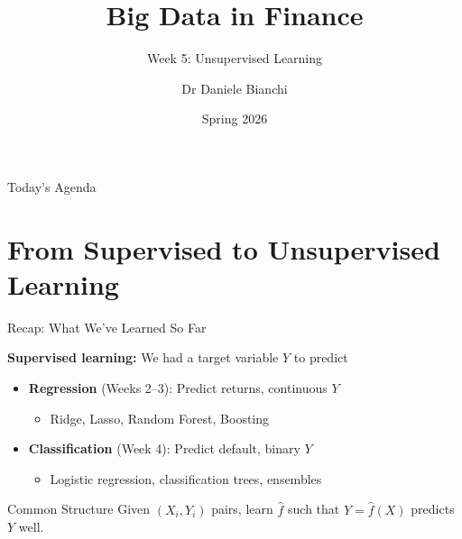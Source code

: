 \documentclass[10pt]{beamer}
\title{Big Data in Finance}
\subtitle{Week 5: Unsupervised Learning}
\author{Dr Daniele Bianchi}
\date{Spring 2026}
\begin{document}
\AtBeginSection[]{
  \begin{frame}[plain]
    \vfill
    \begin{center}
      {\Large\color{ThemeBlue}\insertsection}
    \end{center}
    \vfill
  \end{frame}
}


\begin{frame}[plain]
  \titlepage
\end{frame}

\begin{frame}{Today's Agenda}
  \tableofcontents
\end{frame}

\section{From Supervised to Unsupervised Learning}

\begin{frame}{Recap: What We've Learned So Far}

  \textbf{Supervised learning:} We had a target variable $Y$ to predict

  \vspace{1em}
  \begin{itemize}
    \item \textbf{Regression} (Weeks 2--3): Predict returns, continuous $Y$
    \begin{itemize}
      \item Ridge, Lasso, Random Forest, Boosting
    \end{itemize}

    \vspace{0.5em}
    \item \textbf{Classification} (Week 4): Predict default, binary $Y$
    \begin{itemize}
      \item Logistic regression, classification trees, ensembles
    \end{itemize}
  \end{itemize}

  \vspace{1em}
  \begin{block}{Common Structure}
    Given $(X_i, Y_i)$ pairs, learn $\widehat{f}$ such that $\widehat{Y} = \widehat{f}(X)$ predicts $Y$ well.
  \end{block}
\end{frame}
\end{document}

